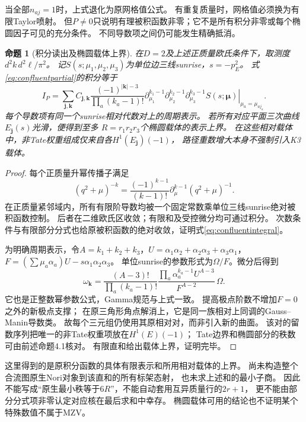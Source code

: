 \documentclass[11pt,a4paper]{ctexart}
\theoremstyle{cnplain}\newtheorem{theorem}{定理}[section]
\newtheorem{proposition}[theorem]{命题}
\theoremstyle{definition}\newtheorem{definition}[theorem]{定义}
\theoremstyle{remark}\newtheorem{remark}[theorem]{注}
\begin{document}
当全部$n_{aj}=1$时，上式退化为原网格值公式。
有重复质量时，网格值必须换为有限Taylor喷射。
但$P\ne0$只说明有理被积函数非零；它不是所有积分非零或每个椭圆因子可见的充分条件。
不同导数项之间仍可能发生精确抵消。

\begin{proposition}[积分读出及椭圆载体上界]\label{prop:confluentelliptic}
在$D=2$及上述正质量欧氏条件下，取测度$d^2k\,d^2\ell/\pi^2$。
记$S(s;\mu_1,\mu_2,\mu_3)$为单位边三线sunrise，$s=-p_E^2$。
式\eqref{eq:confluentpartial}的积分等于
\begin{equation}\label{eq:confluentintegral}
 I_P=\sum_{\boldsymbol j,\boldsymbol k}
 C_{\boldsymbol j,\boldsymbol k}
 \frac{(-1)^{|\boldsymbol k|-3}}{\prod_a(k_a-1)!}
 \left.
 \partial_{\mu_1}^{k_1-1}
 \partial_{\mu_2}^{k_2-1}
 \partial_{\mu_3}^{k_3-1}S(s;\boldsymbol\mu)
 \right|_{\mu_a=\mu_{aj_a}}.
\end{equation}
每个导数项有同一个sunrise相对代数对上的周期表示。
若所有对应平面三次曲线$E_{\boldsymbol j}(s)$光滑，便得到至多
$R=r_1r_2r_3$个椭圆载体的表示上界。
在这些相对载体中，非Tate权重组成仅来自各$H^1(E_{\boldsymbol j})(-1)$，
路径重数增大本身不强制引入K3载体。
\end{proposition}
\begin{proof}
每个正质量升幂传播子满足
\[
 (q^2+\mu)^{-k}
 =\frac{(-1)^{k-1}}{(k-1)!}\partial_\mu^{k-1}(q^2+\mu)^{-1}.
\]
在正质量紧邻域内，所有有限阶导数均被一个固定常数乘单位三线sunrise绝对被积函数控制。
后者在二维欧氏区收敛；有限和及受控微分均可通过积分。
次数条件与有限部分分式也给原被积函数的绝对收敛，证明式\eqref{eq:confluentintegral}。

为明确周期表示，令$A=k_1+k_2+k_3$，$U=\alpha_1\alpha_2+\alpha_2\alpha_3+\alpha_3\alpha_1$，
$F=(\sum\mu_a\alpha_a)U-s\alpha_1\alpha_2\alpha_3$。
单位sunrise的参数形式为$\Omega/F$。微分后得到
\begin{equation}\label{eq:confluentform}
 \omega_{\boldsymbol k}=
 \frac{(A-3)!}{\prod_a(k_a-1)!}
 \frac{\prod_a\alpha_a^{k_a-1}U^{A-3}}{F^{A-2}}\,\Omega.
\end{equation}
它也是正整数幂参数公式，Gamma规范与上式一致。
提高极点阶数不增加$F=0$之外的新极点支撑；
在原三角形角点解消上，它是同一族相对上同调的Gauss--Manin导数类。
故每个三元组仍使用其原相对对，而非引入新的曲面。
该对的留数序列把唯一的非Tate权重项放在$H^1(E)(-1)$；
Tate边界和椭圆部分的秩数可由前述命题4.1核对。
有限直和给出载体上界，证明完毕。
\end{proof}

这里得到的是原积分函数的具体有限表示和所用相对载体的上界。
尚未构造整个合流图原生Nori对象到该直和的所有标架态射，
也未求上述和的最小子商。
因此不能写成“原生最小秩等于$6R$”，不能自动套用互异质量行的$2r+1$，
更不能由部分分式项非零认定对应核在最后求和中幸存。
椭圆载体可用的结论也不证明某个特殊数值不属于MZV。
\end{document}
